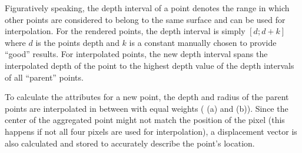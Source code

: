 Figuratively speaking, the depth interval of a point denotes the range in which other points are considered to belong to the same surface and can be used for interpolation. For the rendered points, the depth interval is simply $[d;d+k]$ where $d$ is the points depth and $k$ is a constant manually chosen to provide ``good'' results. For interpolated points, the new depth interval spans the interpolated depth of the point to the highest depth value of the depth intervals of all ``parent'' points.

To calculate the attributes for a new point, the depth and radius of the parent points are interpolated in between with equal weights ( (a) and (b)). Since the center of the aggregated point might not match the position of the pixel (this happens if not all four pixels are used for interpolation), a displacement vector is also calculated and stored to accurately describe the point's location.

